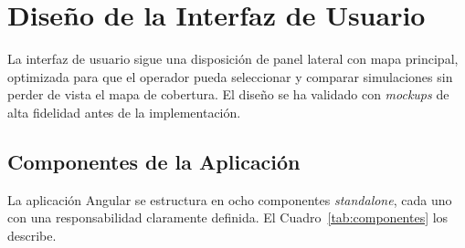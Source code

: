 \section{Diseño de la Interfaz de Usuario}
\label{sec:ui}

La interfaz de usuario sigue una disposición de panel lateral con mapa principal,
optimizada para que el operador pueda seleccionar y comparar simulaciones sin perder de
vista el mapa de cobertura. El diseño se ha validado con \textit{mockups} de alta
fidelidad antes de la implementación.

\subsection{Componentes de la Aplicación}
\label{subsec:componentes}

La aplicación Angular se estructura en ocho componentes \textit{standalone}, cada uno con
una responsabilidad claramente definida. El Cuadro~\ref{tab:componentes} los describe.

